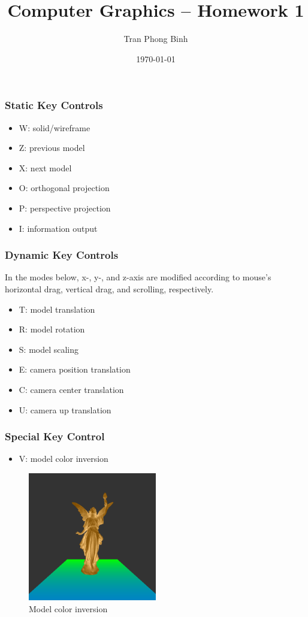 \documentclass{beamer}
\title{Computer Graphics -- Homework 1}
\author{Tran Phong Binh}
\institute{Student ID: 110062421}
\date{\today}
\begin{document}
\begin{frame}
  \titlepage
\end{frame}

\begin{frame}
  \frametitle{Static Key Controls}
  \begin{itemize}
    \item W: solid/wireframe
    \item Z: previous model
    \item X: next model
    \item O: orthogonal projection
    \item P: perspective projection
    \item I: information output
  \end{itemize}
\end{frame}

\begin{frame}
  \frametitle{Dynamic Key Controls}
  In the modes below, x-, y-, and z-axis are modified according to mouse's horizontal drag, vertical drag, and scrolling, respectively.
  \begin{itemize}
    \item T: model translation
    \item R: model rotation
    \item S: model scaling
    \item E: camera position translation
    \item C: camera center translation
    \item U: camera up translation
  \end{itemize}
\end{frame}

\begin{frame}
  \frametitle{Special Key Control}
  \begin{itemize}
    \item V: model color inversion
  \end{itemize}
  \begin{figure}
    \includegraphics[width=0.5\textwidth]{model_color_inversion}
    \caption{Model color inversion}
  \end{figure}
\end{frame}
\end{document}
